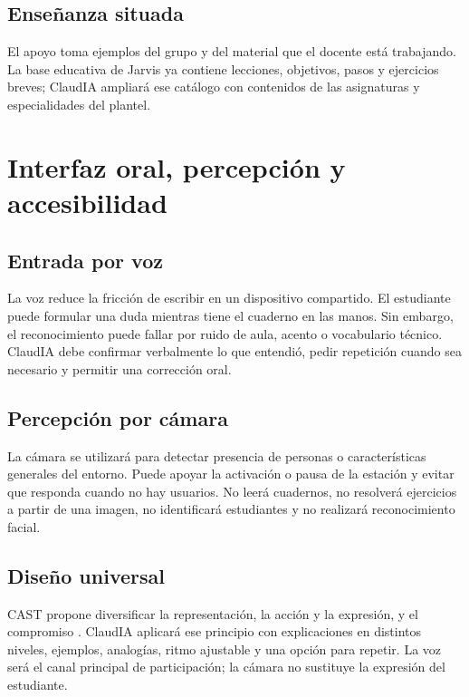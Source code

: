 \documentclass[letterpaper,11pt]{article}
\begin{document}
\subsection{Enseñanza situada}
El apoyo toma ejemplos del grupo y del material que el docente está trabajando. La base educativa de Jarvis ya contiene lecciones, objetivos, pasos y ejercicios breves; ClaudIA ampliará ese catálogo con contenidos de las asignaturas y especialidades del plantel.

\clearpage

\section{Interfaz oral, percepción y accesibilidad}

\subsection{Entrada por voz}
La voz reduce la fricción de escribir en un dispositivo compartido. El estudiante puede formular una duda mientras tiene el cuaderno en las manos. Sin embargo, el reconocimiento puede fallar por ruido de aula, acento o vocabulario técnico. ClaudIA debe confirmar verbalmente lo que entendió, pedir repetición cuando sea necesario y permitir una corrección oral.

\subsection{Percepción por cámara}
La cámara se utilizará para detectar presencia de personas o características generales del entorno. Puede apoyar la activación o pausa de la estación y evitar que responda cuando no hay usuarios. No leerá cuadernos, no resolverá ejercicios a partir de una imagen, no identificará estudiantes y no realizará reconocimiento facial.

\subsection{Diseño universal}
CAST propone diversificar la representación, la acción y la expresión, y el compromiso \cite{cast2024}. ClaudIA aplicará ese principio con explicaciones en distintos niveles, ejemplos, analogías, ritmo ajustable y una opción para repetir. La voz será el canal principal de participación; la cámara no sustituye la expresión del estudiante.
\end{document}
